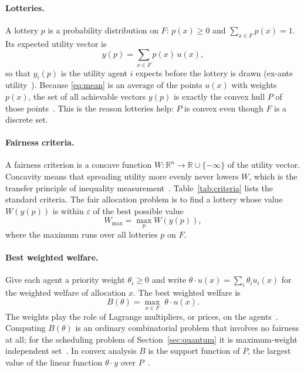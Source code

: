 \documentclass[11pt,a4paper]{article}
\newcommand{\R}{\mathbb{R}}
\begin{document}
\paragraph{Lotteries.} A lottery $p$ is a probability distribution on $F$: $p(x)\ge0$ and
$\sum_{x\in F}p(x)=1$. Its expected utility vector is
\begin{equation}\label{eq:mean}
y(p)=\sum_{x\in F}p(x)\,u(x),
\end{equation}
so that $y_i(p)$ is the utility agent $i$ expects before the lottery is drawn (ex-ante
utility~\cite{aziz2024best}). Because \eqref{eq:mean} is an average of the points $u(x)$ with weights
$p(x)$, the set of all achievable vectors $y(p)$ is exactly the convex hull $P$ of those
points~\cite{rockafellar1970convex}. This is the reason lotteries help: $P$ is convex even though $F$
is a discrete set.

\paragraph{Fairness criteria.} A fairness criterion is a concave function $W:\R^n\to\R\cup\{-\infty\}$
of the utility vector. Concavity means that spreading utility more evenly never lowers $W$, which is
the transfer principle of inequality measurement~\cite{dalton1920measurement,atkinson1970measurement}.
Table~\ref{tab:criteria} lists the standard criteria. The fair allocation problem is to find a lottery
whose value $W(y(p))$ is within $\varepsilon$ of the best possible value
\begin{equation}\label{eq:fair}
W_{\max}=\max_p W(y(p)),
\end{equation}
where the maximum runs over all lotteries $p$ on $F$.

\paragraph{Best weighted welfare.} Give each agent a priority weight $\theta_i\ge0$ and write
$\theta\cdot u(x)=\sum_i\theta_iu_i(x)$ for the weighted welfare of allocation $x$. The best weighted
welfare is
\begin{equation}\label{eq:B}
B(\theta)=\max_{x\in F}\;\theta\cdot u(x).
\end{equation}
The weights play the role of Lagrange multipliers, or prices, on the agents~\cite{boyd2004convex}.
Computing $B(\theta)$ is an ordinary combinatorial problem that involves no fairness at all; for the
scheduling problem of Section~\ref{sec:quantum} it is maximum-weight independent
set~\cite{tassiulas1992stability}. In convex analysis $B$ is the support function of $P$, the largest
value of the linear function $\theta\cdot y$ over $P$~\cite{rockafellar1970convex}.
\end{document}
